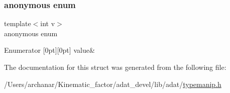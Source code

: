\subsubsection{\texorpdfstring{anonymous enum}{anonymous enum}}
{\footnotesize\ttfamily template$<$int v$>$ \\
anonymous enum}

\begin{DoxyEnumFields}{Enumerator}
[0pt][0pt]{}\mbox{\label{structUtil_1_1Int2Type_a0bd450c2f220057e03c1f7096674ce19a1518d2442ef74c1b5020549a8384f912}} 
value&\\
\hline

\end{DoxyEnumFields}


The documentation for this struct was generated from the following file\+:\begin{DoxyCompactItemize}
\item 
/\+Users/archanar/\+Kinematic\+\_\+factor/adat\+\_\+devel/lib/adat/\mbox{\hyperlink{lib_2adat_2typemanip_8h}{typemanip.\+h}}\end{DoxyCompactItemize}

